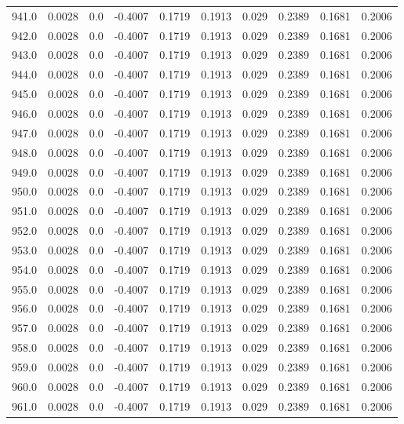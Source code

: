 \begin{longtable}{lrrrrrrrrr}
941.0 & 0.0028 & 0.0 & -0.4007 & 0.1719 & 0.1913 & 0.029 & 0.2389 & 0.1681 & 0.2006 \\
942.0 & 0.0028 & 0.0 & -0.4007 & 0.1719 & 0.1913 & 0.029 & 0.2389 & 0.1681 & 0.2006 \\
943.0 & 0.0028 & 0.0 & -0.4007 & 0.1719 & 0.1913 & 0.029 & 0.2389 & 0.1681 & 0.2006 \\
944.0 & 0.0028 & 0.0 & -0.4007 & 0.1719 & 0.1913 & 0.029 & 0.2389 & 0.1681 & 0.2006 \\
945.0 & 0.0028 & 0.0 & -0.4007 & 0.1719 & 0.1913 & 0.029 & 0.2389 & 0.1681 & 0.2006 \\
946.0 & 0.0028 & 0.0 & -0.4007 & 0.1719 & 0.1913 & 0.029 & 0.2389 & 0.1681 & 0.2006 \\
947.0 & 0.0028 & 0.0 & -0.4007 & 0.1719 & 0.1913 & 0.029 & 0.2389 & 0.1681 & 0.2006 \\
948.0 & 0.0028 & 0.0 & -0.4007 & 0.1719 & 0.1913 & 0.029 & 0.2389 & 0.1681 & 0.2006 \\
949.0 & 0.0028 & 0.0 & -0.4007 & 0.1719 & 0.1913 & 0.029 & 0.2389 & 0.1681 & 0.2006 \\
950.0 & 0.0028 & 0.0 & -0.4007 & 0.1719 & 0.1913 & 0.029 & 0.2389 & 0.1681 & 0.2006 \\
951.0 & 0.0028 & 0.0 & -0.4007 & 0.1719 & 0.1913 & 0.029 & 0.2389 & 0.1681 & 0.2006 \\
952.0 & 0.0028 & 0.0 & -0.4007 & 0.1719 & 0.1913 & 0.029 & 0.2389 & 0.1681 & 0.2006 \\
953.0 & 0.0028 & 0.0 & -0.4007 & 0.1719 & 0.1913 & 0.029 & 0.2389 & 0.1681 & 0.2006 \\
954.0 & 0.0028 & 0.0 & -0.4007 & 0.1719 & 0.1913 & 0.029 & 0.2389 & 0.1681 & 0.2006 \\
955.0 & 0.0028 & 0.0 & -0.4007 & 0.1719 & 0.1913 & 0.029 & 0.2389 & 0.1681 & 0.2006 \\
956.0 & 0.0028 & 0.0 & -0.4007 & 0.1719 & 0.1913 & 0.029 & 0.2389 & 0.1681 & 0.2006 \\
957.0 & 0.0028 & 0.0 & -0.4007 & 0.1719 & 0.1913 & 0.029 & 0.2389 & 0.1681 & 0.2006 \\
958.0 & 0.0028 & 0.0 & -0.4007 & 0.1719 & 0.1913 & 0.029 & 0.2389 & 0.1681 & 0.2006 \\
959.0 & 0.0028 & 0.0 & -0.4007 & 0.1719 & 0.1913 & 0.029 & 0.2389 & 0.1681 & 0.2006 \\
960.0 & 0.0028 & 0.0 & -0.4007 & 0.1719 & 0.1913 & 0.029 & 0.2389 & 0.1681 & 0.2006 \\
961.0 & 0.0028 & 0.0 & -0.4007 & 0.1719 & 0.1913 & 0.029 & 0.2389 & 0.1681 & 0.2006 \\

\end{longtable}
